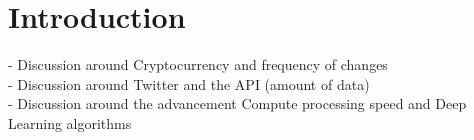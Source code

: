 \chapter{Introduction}
- Discussion around Cryptocurrency and frequency of changes \\
- Discussion around Twitter and the API (amount of data) \\
- Discussion around the advancement Compute processing speed and Deep Learning algorithms